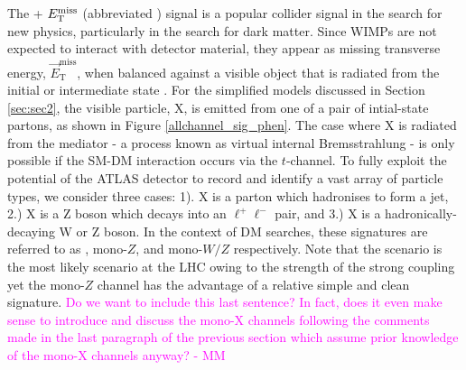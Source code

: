 The \monoX + $E_{\mathrm{T}}^{\mathrm{miss}}$ (abbreviated \monoX) signal is a popular collider signal in the search for new physics, particularly in the search for dark matter. Since WIMPs are not expected to interact with detector material, they appear as missing transverse energy, $\vec{E}_{\mathrm{T}}^{\mathrm{miss}}$, when balanced against a visible object that is radiated from the initial or intermediate state \cite{some MET definition/discussion paper}.
For the simplified models discussed in Section \ref{sec:sec2}, the visible particle, X, is emitted from one of a pair of intial-state partons, as shown in Figure \ref{allchannel_sig_phen}. The case where X is radiated from the mediator - a process known as virtual internal Bremsstrahlung - is only possible if the SM-DM interaction occurs via the $t$-channel.
To fully exploit the potential of the ATLAS detector to record and identify a vast array of particle types, we consider three cases: 1). X is a parton which hadronises to form a jet, 2.) X is a Z boson which decays into an $\ell^+ \ell^-$ pair, and 3.) X is a hadronically-decaying W or Z boson. In the context of DM searches, these signatures are referred to as \monojet, mono-$Z$, and mono-$W/Z$ respectively. Note that the \monojet scenario is the most likely scenario at the LHC owing to the strength of the strong coupling yet the mono-$Z$ channel has the advantage of a relative simple and clean signature. \textcolor{magenta}{Do we want to include this last sentence? In fact, does it even make sense to introduce and discuss the mono-X channels following the comments made in the last paragraph of the previous section which assume prior knowledge of the mono-X channels anyway? - MM}



